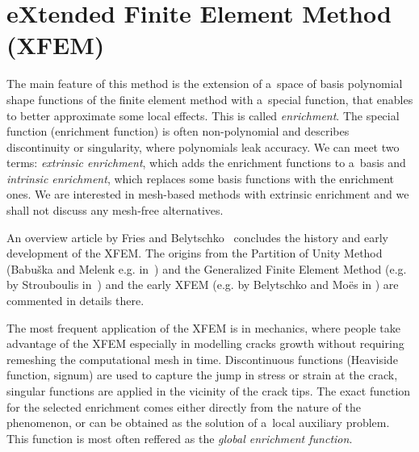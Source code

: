 



\section{eXtended Finite Element Method (XFEM)} \label{sec:soa_xfem}

The main feature of this method is the extension of a~space of basis polynomial shape functions of the finite element
method with a~special function, that enables to better approximate some local effects. This is called \emph{enrichment}.
The special function (enrichment function) is often non-polynomial and describes discontinuity or singularity,
where polynomials leak accuracy. We can meet two terms: \emph{extrinsic enrichment}, which adds the enrichment
functions to a~basis and \emph{intrinsic enrichment}, which replaces some basis functions with the enrichment ones.
We are interested in mesh-based methods with extrinsic enrichment and we shall not discuss any mesh-free alternatives.

An overview article by Fries and Belytschko~\cite{fries_xfem_overview_2010} concludes the history and early development
of the XFEM. The origins from the Partition of Unity Method (Babu{\v s}ka and Melenk e.g. in~\cite{babuska_partition_1997}) and
the Generalized Finite Element Method (e.g. by Strouboulis in~\cite{strouboulis_generalized_2000}) 
and the early XFEM (e.g. by Belytschko and Mo{\"e}s in \cite{moes_finite_1999}) are commented in details there.

The most frequent application of the XFEM is in mechanics, where people take advantage of the XFEM especially in
modelling cracks growth without requiring remeshing the computational mesh in time. 
Discontinuous functions (Heaviside function, signum) are used to capture the jump in stress or strain at the crack,
singular functions are applied in the vicinity of the crack tips. The exact function for the selected enrichment
comes either directly from the nature of the phenomenon, or can be obtained as the solution of a~local auxiliary
problem. This function is most often reffered as the \emph{global enrichment function}.

